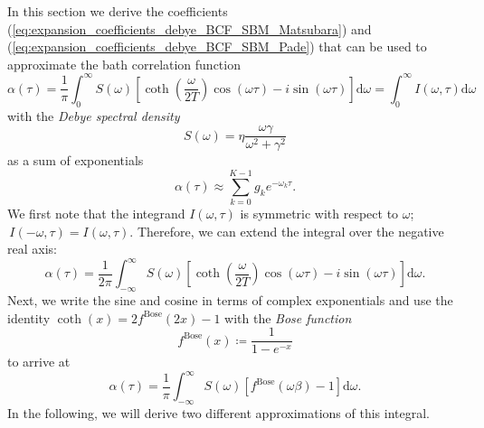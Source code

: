 In this section we derive the coefficients (\ref{eq:expansion_coefficients_debye_BCF_SBM_Matsubara}) and (\ref{eq:expansion_coefficients_debye_BCF_SBM_Pade}) that can be used to approximate the bath correlation function
\begin{equation*}
    \alpha(\tau) = \frac{1}{\pi} \int_0^\infty S(\omega)
    \left[
        \coth\left(\frac{\omega}{2T}\right)\cos(\omega\tau)-i\sin(\omega\tau)
    \right]\text{d}\omega
    = \int_0^\infty I(\omega,\tau)\text{d}\omega
\end{equation*}
with the \textit{Debye spectral density}
\begin{equation*}
    S(\omega) = \eta \frac{\omega\gamma}{\omega^2+\gamma^2}
\end{equation*}
as a sum of exponentials
\begin{equation*}
    \alpha(\tau) \approx \sum_{k=0}^{K-1}g_ke^{-\omega_k\tau}.
\end{equation*}
We first note that the integrand $I(\omega, \tau)$ is symmetric with respect to $\omega$; $\,I(-\omega, \tau) = I(\omega, \tau)$.
Therefore, we can extend the integral over the negative real axis:
\begin{equation*}
    \alpha(\tau) = \frac{1}{2\pi} \int_{-\infty}^\infty S(\omega)
    \left[
        \coth\left(\frac{\omega}{2T}\right)\cos(\omega\tau)-i\sin(\omega\tau)
    \right]\text{d}\omega.
\end{equation*}
Next, we write the sine and cosine in terms of complex exponentials and use the identity $\coth(x) = 2f^\text{Bose}(2x) - 1$
with the \textit{Bose function}
\begin{equation*}
    f^\text{Bose}(x) \coloneqq \frac{1}{1-e^{-x}}
\end{equation*}
to arrive at
\begin{equation}
    \label{eq:transformed_BCF_Bose}
    \alpha(\tau) = \frac{1}{\pi} \int_{-\infty}^\infty S(\omega)
    \left[
        f^\text{Bose}(\omega\beta)-1
    \right]\text{d}\omega.
\end{equation}
In the following, we will derive two different approximations of this integral.

